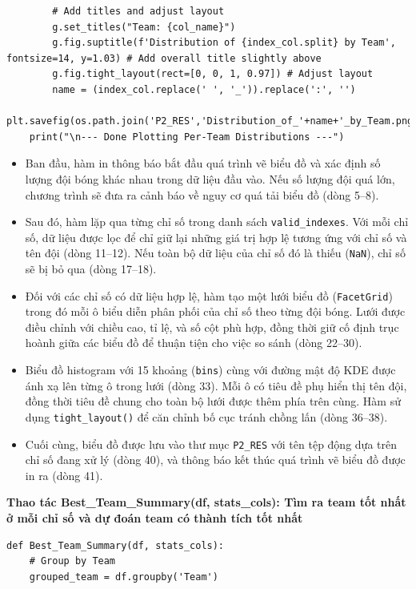 \documentclass[12pt]{report}
\begin{document}
{\begin{lstlisting}
        # Add titles and adjust layout
        g.set_titles("Team: {col_name}")
        g.fig.suptitle(f'Distribution of {index_col.split} by Team', fontsize=14, y=1.03) # Add overall title slightly above
        g.fig.tight_layout(rect=[0, 0, 1, 0.97]) # Adjust layout
        name = (index_col.replace(' ', '_')).replace(':', '')
        plt.savefig(os.path.join('P2_RES','Distribution_of_'+name+'_by_Team.png'))
    print("\n--- Done Plotting Per-Team Distributions ---")
\end{lstlisting}
\begin{itemize}
    \item Ban đầu, hàm in thông báo bắt đầu quá trình vẽ biểu đồ và xác định số lượng đội bóng khác nhau trong dữ liệu đầu vào. Nếu số lượng đội quá lớn, chương trình sẽ đưa ra cảnh báo về nguy cơ quá tải biểu đồ (dòng 5–8).
    \item Sau đó, hàm lặp qua từng chỉ số trong danh sách \texttt{valid\_indexes}. Với mỗi chỉ số, dữ liệu được lọc để chỉ giữ lại những giá trị hợp lệ tương ứng với chỉ số và tên đội (dòng 11–12). Nếu toàn bộ dữ liệu của chỉ số đó là thiếu (\texttt{NaN}), chỉ số sẽ bị bỏ qua (dòng 17–18).
    \item Đối với các chỉ số có dữ liệu hợp lệ, hàm tạo một lưới biểu đồ (\texttt{FacetGrid}) trong đó mỗi ô biểu diễn phân phối của chỉ số theo từng đội bóng. Lưới được điều chỉnh với chiều cao, tỉ lệ, và số cột phù hợp, đồng thời giữ cố định trục hoành giữa các biểu đồ để thuận tiện cho việc so sánh (dòng 22–30).
    \item Biểu đồ histogram với 15 khoảng (\texttt{bins}) cùng với đường mật độ KDE được ánh xạ lên từng ô trong lưới (dòng 33). Mỗi ô có tiêu đề phụ hiển thị tên đội, đồng thời tiêu đề chung cho toàn bộ lưới được thêm phía trên cùng. Hàm sử dụng \texttt{tight\_layout()} để căn chỉnh bố cục tránh chồng lấn (dòng 36–38).
    \item Cuối cùng, biểu đồ được lưu vào thư mục \texttt{P2\_RES} với tên tệp động dựa trên chỉ số đang xử lý (dòng 40), và thông báo kết thúc quá trình vẽ biểu đồ được in ra (dòng 41).
\end{itemize}
\textbf* {Thao tác Best\_Team\_Summary(df, stats\_cols): Tìm ra team tốt nhất ở mỗi chỉ số và dự đoán team có thành tích tốt nhất}
\begin{lstlisting}
def Best_Team_Summary(df, stats_cols):
    # Group by Team
    grouped_team = df.groupby('Team')


\end{lstlisting}}
\end{document}
